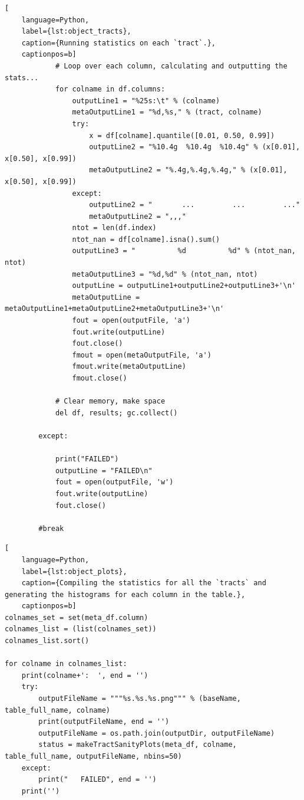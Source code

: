 \documentclass[DM,authoryear,toc]{lsstdoc}
\begin{document}
\begin{lstlisting}[
    language=Python,
    label={lst:object_tracts},
    caption={Running statistics on each `tract`.},
    captionpos=b]
            # Loop over each column, calculating and outputting the stats...
            for colname in df.columns:
                outputLine1 = "%25s:\t" % (colname)
                metaOutputLine1 = "%d,%s," % (tract, colname)
                try:
                    x = df[colname].quantile([0.01, 0.50, 0.99])
                    outputLine2 = "%10.4g  %10.4g  %10.4g" % (x[0.01], x[0.50], x[0.99])
                    metaOutputLine2 = "%.4g,%.4g,%.4g," % (x[0.01], x[0.50], x[0.99])
                except:
                    outputLine2 = "       ...         ...         ..."
                    metaOutputLine2 = ",,,"
                ntot = len(df.index)
                ntot_nan = df[colname].isna().sum()
                outputLine3 = "          %d          %d" % (ntot_nan, ntot)
                metaOutputLine3 = "%d,%d" % (ntot_nan, ntot)
                outputLine = outputLine1+outputLine2+outputLine3+'\n'
                metaOutputLine = metaOutputLine1+metaOutputLine2+metaOutputLine3+'\n'
                fout = open(outputFile, 'a')
                fout.write(outputLine)
                fout.close()
                fmout = open(metaOutputFile, 'a')
                fmout.write(metaOutputLine)
                fmout.close()

            # Clear memory, make space
            del df, results; gc.collect()   

        except:
        
            print("FAILED")
            outputLine = "FAILED\n"
            fout = open(outputFile, 'w')
            fout.write(outputLine)
            fout.close()
            
        #break
\end{lstlisting}


\clearpage



\begin{lstlisting}[
    language=Python,
    label={lst:object_plots},
    caption={Compiling the statistics for all the `tracts` and generating the histograms for each column in the table.},
    captionpos=b]
colnames_set = set(meta_df.column)
colnames_list = (list(colnames_set))
colnames_list.sort()

for colname in colnames_list:
    print(colname+':  ', end = '')
    try:
        outputFileName = """%s.%s.%s.png""" % (baseName, table_full_name, colname)
        print(outputFileName, end = '')
        outputFileName = os.path.join(outputDir, outputFileName)
        status = makeTractSanityPlots(meta_df, colname, table_full_name, outputFileName, nbins=50)
    except:
        print("   FAILED", end = '')
    print('')
\end{lstlisting}
\end{document}
